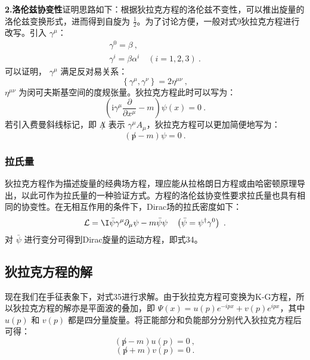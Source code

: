 \textbf{2.洛伦兹协变性}证明思路如下：根据狄拉克方程的洛伦兹不变性，可以推出旋量的洛伦兹变换形式，进而得到自旋为 $\frac{1}{2}$。为了讨论方便，一般对式9狄拉克方程进行改写。引入 $\gamma^{\mu}$：
\begin{equation}
\begin{array}{l}
\gamma^{0}=\beta~, \\
\gamma^{i}=\beta \alpha^{i} \quad(i=1,2,3)~.
\end{array}
\end{equation}
可以证明， $\gamma^{\mu}$ 满足反对易关系：
\begin{equation}
\left\{\gamma^{\mu}, \gamma^{\nu}\right\}=2 \eta^{\mu \nu}~,
\end{equation}
$\eta^{\mu \nu}$ 为闵可夫斯基空间的度规张量。狄拉克方程此时可以写为：
\begin{equation}\label{eq_qed4_22}
\left(\mathrm{i} \gamma^{\mu} \frac{\partial}{\partial x^{\mu}}-m\right) \psi(x)=0~.
\end{equation}
若引入费曼斜线标记，即 $\not A$ 表示 $\gamma^{\mu}A_{\mu}$，狄拉克方程可以更加简便地写为：
\begin{equation}\label{eq_qed4_21}
( \not p-m) \psi=0~.
\end{equation}

\subsubsection{拉氏量}
狄拉克方程作为描述旋量的经典场方程，理应能从拉格朗日方程或由哈密顿原理导出，以此可作为拉氏量的一种验证方式。方程的洛伦兹协变性要求拉氏量也具有相同的协变性。在无相互作用的条件下，Dirac场的拉氏密度如下：
\begin{equation}\label{eq_qed4_20}
\mathcal{L}=\mathrm{\I} \bar{\psi} \gamma^{\mu} \partial_{\mu} \psi-m \bar{\psi} \psi \quad\left(\bar{\psi}=\psi^{\dagger} \gamma^{0}\right)~.
\end{equation}
对 $\bar\psi$ 进行变分可得到Dirac旋量的运动方程，即式34。

\subsection{狄拉克方程的解}
现在我们在手征表象下，对式35进行求解。由于狄拉克方程可变换为K-G方程，所以狄拉克方程的解亦是平面波的叠加，即 $\Psi(x)=u(p)e^{-ipx}+v(p)e^{ipx}$，其中 $u(p)$ 和 $v(p)$ 都是四分量旋量。将正能部分和负能部分分别代入狄拉克方程后可得：
\begin{equation}\label{eq_qed4_23}
(\not p-m) u(p)=0 ~,
\end{equation}
\begin{equation}
(\not p+m) v(p)=0~.
\end{equation}

